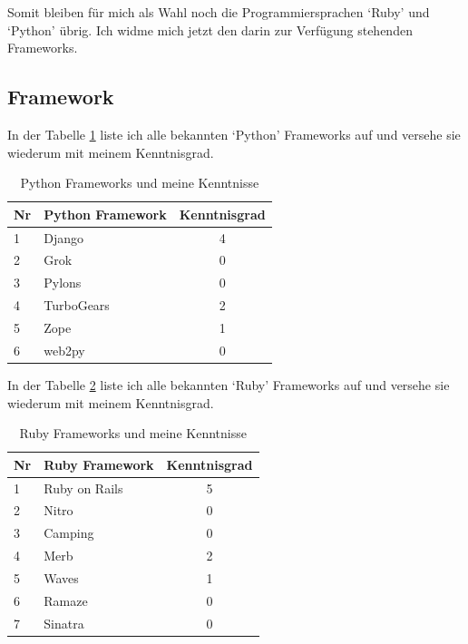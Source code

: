 Somit bleiben für mich als Wahl noch die Programmiersprachen `Ruby' und `Python'
übrig. Ich widme mich jetzt den darin zur Verfügung stehenden Frameworks.

\subsection{Framework}
In der Tabelle \ref{tab:python_frameworks} liste ich alle bekannten `Python' 
Frameworks \cite{python_frameworks} auf und versehe sie wiederum mit meinem Kenntnisgrad.

\begin{table}[h]
\begin{center}
    \begin{tabular}{llc}
        \toprule Nr & Python Framework & Kenntnisgrad \\
        \midrule 1 & Django & 4 \\
        \midrule 2 & Grok & 0 \\
        \midrule 3 & Pylons & 0 \\
        \midrule 4 & TurboGears & 2 \\
        \midrule 5 & Zope & 1 \\
        \midrule 6 & web2py & 0 \\
        \bottomrule
    \end{tabular}
    \caption{Python Frameworks und meine Kenntnisse}
    \label{tab:python_frameworks}
\end{center}
\end{table}

\clearpage

In der Tabelle \ref{tab:ruby_frameworks} liste ich alle bekannten `Ruby' 
Frameworks \cite{ruby_frameworks} auf und versehe sie wiederum mit meinem Kenntnisgrad.

\begin{table}[ht]
\begin{center}
    \begin{tabular}{llc}
        \toprule Nr & Ruby Framework & Kenntnisgrad \\
        \midrule 1 & Ruby on Rails & 5 \\
        \midrule 2 & Nitro & 0 \\
        \midrule 3 & Camping & 0 \\
        \midrule 4 & Merb & 2 \\
        \midrule 5 & Waves & 1 \\
        \midrule 6 & Ramaze & 0 \\
        \midrule 7 & Sinatra & 0 \\
        \bottomrule
    \end{tabular}
    \caption{Ruby Frameworks und meine Kenntnisse}
    \label{tab:ruby_frameworks}
\end{center}
\end{table}

